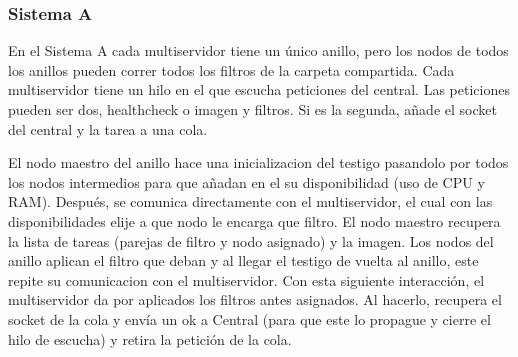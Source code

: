 \documentclass{article}
\begin{document}
\begin{flushleft}
			\clearpage
			\subsubsection{Sistema A}
			En el Sistema A cada multiservidor tiene un único anillo, pero los nodos de todos los anillos pueden correr todos los filtros de la carpeta compartida. Cada multiservidor tiene un hilo en el que escucha peticiones del central. Las peticiones pueden ser dos, healthcheck o imagen y filtros. Si es la segunda, añade el socket del central y la tarea a una cola. 
			\linebreak
			
			El nodo maestro del anillo hace una inicializacion del testigo pasandolo por todos los nodos intermedios para que añadan en el su disponibilidad (uso de CPU y RAM). Después, se comunica directamente con el multiservidor, el cual con las disponibilidades elije a que nodo le encarga que filtro. El nodo maestro recupera la lista de tareas (parejas de filtro y nodo asignado) y la imagen. Los nodos del anillo aplican el filtro que deban y al llegar el testigo de vuelta al anillo, este repite su comunicacion con el multiservidor. Con esta siguiente interacción, el multiservidor da por aplicados los filtros antes asignados. Al hacerlo, recupera el socket de la cola y envía un ok a Central (para que este lo propague y cierre el hilo de escucha) y retira la petición de la cola.
			\linebreak
			
			\hspace*{-1cm}
			\bigskip
			

\end{flushleft}
\end{document}
